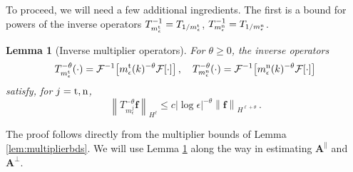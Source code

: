 \documentclass[11pt,reqno]{amsart}
\newcommand{\abs}[1]{\left\lvert #1 \right\rvert}
\newcommand{\norm}[1]{\left\lVert #1 \right\rVert}
\newcommand{\mc}[1]{\mathcal{#1}}
\numberwithin{equation}{section}
\newtheorem{lemma}[theorem]{Lemma}
\theoremstyle{definition}
\begin{document}
To proceed, we will need a few additional ingredients. The first is a bound for powers of the inverse operators $T_{m_\epsilon^{\rm t}}^{-1}=T_{1/m_\epsilon^{\rm t}}$, $T_{m_\epsilon^{\rm n}}^{-1}=T_{1/m_\epsilon^{\rm n}}$.
\begin{lemma}[Inverse multiplier operators]\label{lem:Tinverse}
  For $\theta\ge 0$, the inverse operators 
  \begin{equation}
    T_{m_\epsilon^{\rm t}}^{-\theta}(\cdot) = \mc{F}^{-1}\big[m_\epsilon^{\rm t}(k)^{-\theta}\mc{F}[\cdot]\big]\,, \quad
    T_{m_\epsilon^{\rm n}}^{-\theta}(\cdot) = \mc{F}^{-1}\big[m_\epsilon^{\rm n}(k)^{-\theta}\mc{F}[\cdot]\big]
  \end{equation}
satisfy, for $j={\rm t},{\rm n}$,
  \begin{equation}
    \norm{T_{m_\epsilon^j}^{-\theta}\bm{f}}_{H^\ell} \le c\abs{\log\epsilon}^{-\theta}\norm{\bm{f}}_{H^{\ell+\theta}}\,.
  \end{equation}
\end{lemma}
The proof follows directly from the multiplier bounds of Lemma \ref{lem:multiplierbds}.
%
%
We will use Lemma \ref{lem:Tinverse} along the way in estimating $\bm{A}^\parallel$ and $\bm{A}^\perp$.

\end{document}
